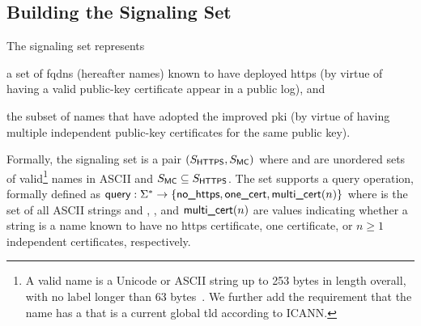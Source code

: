 
\subsection{Building the Signaling Set}
\label{sec:design:signaling}

The signaling set represents
\begin{inparaenum}
\item a set of \acp{fqdn} (hereafter names) known to have deployed \ac{https}
  (by virtue of having a valid public-key certificate appear in a public log), and
\item the subset of names that have adopted the improved \ac{pki} (by
  virtue of having multiple independent public-key certificates for the same
  public key).
\end{inparaenum}
Formally, the signaling set is a pair $(S_{\textsf{HTTPS}}, S_{\textsf{MC}})$ where
\httpsset and \multicertset are unordered sets of valid\footnote{A valid
  name is a Unicode or ASCII string up to 253 bytes in length overall,
  with no label longer than 63 bytes~\cite{rfc1035}. We further add the
requirement that the name has a  that is a current global \ac{tld}
according to ICANN.} names in ASCII and $S_{\textsf{MC}} \subseteq
S_{\textsf{HTTPS}}$. The set supports a query operation, formally defined as $\textsf{query}:
\Sigma^* \to \{\textsf{no\_https}, \textsf{one\_cert}, \textsf{multi\_cert}(n)\}$ where \strings is the set of
all ASCII strings and \nohttps, \onecert, and $\textsf{multi\_cert}(n)$ are values indicating
whether a string is a name known to have no \ac{https} certificate, one
certificate, or $n\geq 1$ independent certificates, respectively.

